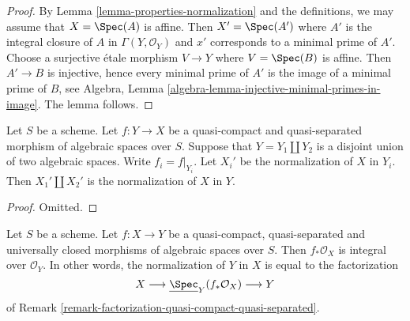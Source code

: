 \begin{proof}
By Lemma \ref{lemma-properties-normalization} and the definitions, we may
assume that $X = \Spec(A)$ is affine. Then $X' = \Spec(A')$ where $A'$ is
the integral closure of $A$ in $\Gamma(Y, \mathcal{O}_Y)$ and $x'$ corresponds
to a minimal prime of $A'$. Choose a surjective \'etale
morphism $V \to Y$ where $V = \Spec(B)$ is affine. Then
$A' \to B$ is injective, hence every minimal prime of $A'$ is
the image of a minimal prime of $B$, see
Algebra, Lemma \ref{algebra-lemma-injective-minimal-primes-in-image}.
The lemma follows.
\end{proof}

\begin{lemma}
\label{lemma-normalization-in-disjoint-union}
Let $S$ be a scheme.
Let $f : Y \to X$ be a quasi-compact and quasi-separated morphism of
algebraic spaces over $S$.
Suppose that $Y = Y_1 \amalg Y_2$ is a disjoint union of two
algebraic spaces.
Write $f_i = f|_{Y_i}$. Let $X_i'$ be the normalization of $X$ in $Y_i$.
Then $X_1' \amalg X_2'$ is the normalization of $X$ in $Y$.
\end{lemma}

\begin{proof}
Omitted.
\end{proof}

\begin{lemma}
\label{lemma-normalization-in-universally-closed}
Let $S$ be a scheme.
Let $f : X \to Y$ be a quasi-compact, quasi-separated and
universally closed morphisms of algebraic spaces over $S$.
Then $f_*\mathcal{O}_X$ is integral over $\mathcal{O}_Y$. In other
words, the normalization of $Y$ in $X$ is equal to the factorization
$$
X \longrightarrow \underline{\Spec}_Y(f_*\mathcal{O}_X)
\longrightarrow Y
$$
of Remark \ref{remark-factorization-quasi-compact-quasi-separated}.
\end{lemma}

